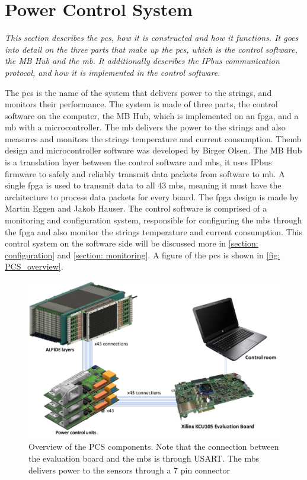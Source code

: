 \documentclass[main.tex]{subfiles}
\begin{document}
\section{Power Control System}
\label{section: pcs}
\textit{This section describes the \acrlong{pcs}, how it is constructed and how it functions. It goes into detail on the three parts that make up the \gls{pcs}, which is the control software, the MB Hub and the \gls{mb}. It additionally describes the IPbus communication protocol, and how it is implemented in the control software.}

The \gls{pcs} is the name of the system that delivers power to the strings, and monitors their performance. The system is made of three parts, the control software on the computer, the MB Hub, which is implemented on an \gls{fpga}, and a \acrlong{mb} with a microcontroller. The \gls{mb} delivers the power to the strings and also measures and monitors the strings temperature and current consumption. The\gls{mb} design and microcontroller software was developed by Birger Olsen. The MB Hub is a translation layer between the control software and \gls{mb}s, it uses IPbus firmware to safely and reliably transmit data packets from software to \gls{mb}. A single \gls{fpga} is used to transmit data to all 43 \gls{mb}s, meaning it must have the architecture to process data packets for every board. The \gls{fpga} design is made by Martin Eggen and Jakob Hauser. The control software is comprised of a monitoring and configuration system, responsible for configuring the \gls{mb}s through the \gls{fpga} and also monitor the strings temperature and current consumption. This control system on the software side will be discussed more in \autoref{section: configuration} and \autoref{section: monitoring}. A figure of the \gls{pcs} is shown in \autoref{fig: PCS_overview}.

\begin{figure}[!htpb]
    \centering
    \includegraphics[width=15cm]{images/PowerDeliverySystemOverview.png}
    \caption{Overview of the PCS components. Note that the connection between the evaluation board and the \gls{mb}s is through USART. The \gls{mb}s delivers power to the sensors through a 7 pin connector\cite{gutta}}
    \label{fig: PCS_overview}
\end{figure}
\FloatBarrier
\end{document}
